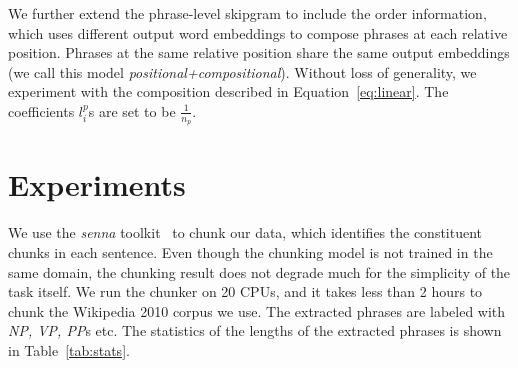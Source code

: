 We further extend the phrase-level skipgram to include the order information, which
uses different output word embeddings to compose phrases at each relative position. Phrases at the same relative position share the same
output embeddings (we call this model \textit{positional+compositional}).
Without loss of generality, we experiment with the composition
described in Equation~\ref{eq:linear}. The coefficients $l_i^p$s are set to be $\frac{1}{n_p}$.
\section{Experiments}
\begin{table}
\centering
\begin{center}
\caption{\small{Examples of nearest neighbors using word2vec and using additional compositional model}}
\label{tab:neigh}
\end{center}
\end{table}
\label{sec:experiment}
We use the \textit{senna} toolkit~\cite{collobert2011scratch} to chunk our data,
which identifies the constituent chunks in each sentence. Even though the chunking model is 
not trained in the same domain, the chunking result does not degrade much 
for the simplicity of the task itself. We run the chunker on 20 CPUs, and it takes less
than 2 hours to chunk the Wikipedia 2010 corpus we use. %
The extracted phrases are labeled with \textit{NP, VP, PP}s etc. The statistics of the lengths of the extracted phrases 
is shown in Table~\ref{tab:stats}.


